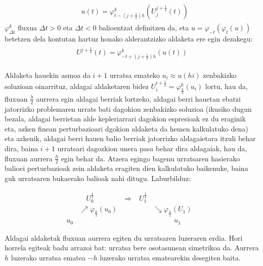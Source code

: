 \begin{align}
\begin{split}
\label{eq: uUaldaketa}
&u(t) = \varphi_{t-(j+\frac{1}{2})h}^k\left(U_j^{j+\frac{1}{2}}(t)\right)
\end{split}
\end{align} 
$\varphi_{\Delta t}^k$ fluxua $\Delta t>0$ eta $\Delta t <0$ balioentzat definitzen da, eta  $u= \varphi_{-t}(\varphi_{t}(u))$ betetzen dela kontutan hartuz honako alderantzizko aldaketa ere egin dezakegu:
\begin{align}
\begin{split}
\label{eq: Uualdaketa}
U^{j+\frac{1}{2}}(t) = \varphi^k_{-t+(j+\frac{1}{2})h} \left( u(t) \right)
\end{split}
\end{align} 

Aldaketa hauekin asmoa da $i+1$ urratsa emateko $u_i \approx u(hi)$ zenbakizko soluzioan oinarrituz, aldagai aldaketaren bidez $U_i^{i+\frac{1}{2}}=\varphi^k_{\frac{h}{2}}(u_i)$ lortu, hau da, fluxuan $\frac{h}{2}$ aurrera egin aldagai berriak lortzeko, aldagai berri hauetan ebatzi jatorrizko problemaren urrats bati dagokion zenbakizko soluzioa (ikusiko dugun bezala, aldagai berrietan alde kepleriarrari dagokion espresioak ez du eraginik eta, azken finean perturbazioari dgokion aldaketa da hemen kalkulatuko dena) eta azkenik, aldagai berri hauen balio berriak jatorrizko aldagaietara itzuli behar dira, baina $i+1$ urratsari dagozkion unera pasa behar dira aldagaiak, hau da, fluxuan aurrera $\frac{h}{2}$ egin behar da. Atzera egingo bagenu urratsaren hasierako balioei perturbazioak zein aldaketa eragiten dien kalkulatuko baikenuke, baina guk urratsaren bukaerako balioak nahi ditugu. Laburbilduz:


\begin{align*}
   &   \quad U_0^{\frac{1}{2}} \quad \quad \quad \quad \Longrightarrow  & U_1^{\frac{1}{2}}&  &\\
  & \nearrow \varphi_{\frac{h}{2}}(u_0) &            & \searrow \varphi_{\frac{h}{2}}(U_1)& \\
u_0 &                  &    &\quad \quad \quad  u_1
\end{align*}

Aldagai aldaketak fluxuan aurrera egiten du urratsaren luzeraren erdia. Hori horrela egiteak badu arrazoi bat: urratsa bere osotasunean simetrikoa da. Aurrera $h$ luzerako urratsa ematea $-h$ luzerako urratsa ematearekin desegiten baita. 


